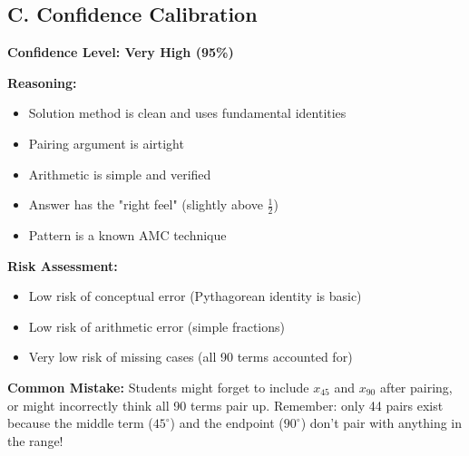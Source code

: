 \documentclass[12pt]{article}
\begin{document}
\begin{verificationbox}
\subsection*{C. Confidence Calibration}

\textbf{Confidence Level: Very High (95\%)}

\textbf{Reasoning:}
\begin{itemize}
    \item Solution method is clean and uses fundamental identities
    \item Pairing argument is airtight
    \item Arithmetic is simple and verified
    \item Answer has the "right feel" (slightly above $\frac{1}{2}$)
    \item Pattern is a known AMC technique
\end{itemize}

\textbf{Risk Assessment:}
\begin{itemize}
    \item Low risk of conceptual error (Pythagorean identity is basic)
    \item Low risk of arithmetic error (simple fractions)
    \item Very low risk of missing cases (all 90 terms accounted for)
\end{itemize}
\end{verificationbox}

\vspace{1em}

\begin{warningbox}
\textbf{Common Mistake:} Students might forget to include $x_{45}$ and $x_{90}$ after pairing, or might incorrectly think all 90 terms pair up. Remember: only 44 pairs exist because the middle term ($45^{\circ}$) and the endpoint ($90^{\circ}$) don't pair with anything in the range!
\end{warningbox}

\vspace{1em}
\end{document}
